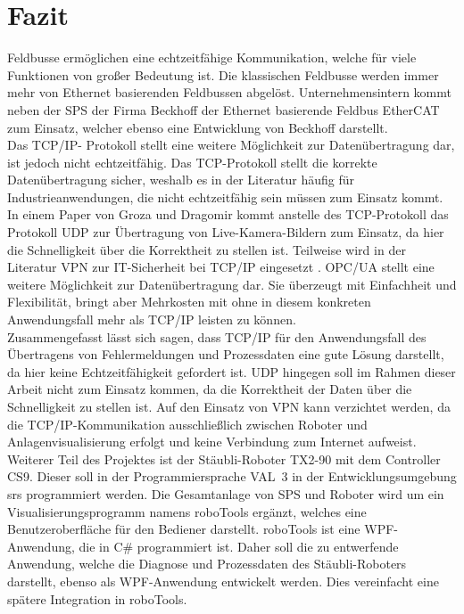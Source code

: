\documentclass[ a4paper,
                oneside,
                toc=bibliography,
                toc=listof
                ]{scrbook}
\begin{document}
   	
   	\section{Fazit}
   	Feldbusse ermöglichen eine echtzeitfähige Kommunikation, welche für viele Funktionen von großer Bedeutung ist. Die klassischen Feldbusse werden immer mehr von Ethernet basierenden Feldbussen abgelöst. Unternehmensintern kommt neben der SPS der Firma Beckhoff der Ethernet basierende Feldbus EtherCAT zum Einsatz, welcher ebenso eine Entwicklung von Beckhoff darstellt.\\
   	Das TCP/IP- Protokoll stellt eine weitere Möglichkeit zur Datenübertragung dar, ist jedoch nicht echtzeitfähig. Das TCP-Protokoll stellt die korrekte Datenübertragung sicher, weshalb es in der Literatur häufig für Industrieanwendungen, die nicht echtzeitfähig sein müssen zum Einsatz kommt.
   	In einem Paper von Groza und Dragomir \cite{groza2008using} kommt anstelle des TCP-Protokoll das Protokoll UDP zur Übertragung von Live-Kamera-Bildern zum Einsatz, da hier die Schnelligkeit über die Korrektheit zu stellen ist. Teilweise wird in der Literatur VPN zur IT-Sicherheit bei TCP/IP eingesetzt \cite{groza2008using}. OPC/UA stellt eine weitere Möglichkeit zur Datenübertragung dar. Sie überzeugt mit Einfachheit und Flexibilität, bringt aber Mehrkosten mit ohne in diesem konkreten Anwendungsfall mehr als TCP/IP leisten zu können.\\ Zusammengefasst lässt sich sagen, dass TCP/IP für den Anwendungsfall des Übertragens von Fehlermeldungen und Prozessdaten eine gute Lösung darstellt, da hier keine Echtzeitfähigkeit gefordert ist. UDP hingegen soll im Rahmen dieser Arbeit nicht zum Einsatz kommen, da die Korrektheit der Daten über die Schnelligkeit zu stellen ist. Auf den Einsatz von VPN kann verzichtet werden, da die TCP/IP-Kommunikation ausschließlich zwischen Roboter und Anlagenvisualisierung erfolgt und keine Verbindung zum Internet aufweist.\\
   	Weiterer Teil des Projektes ist der Stäubli-Roboter TX2-90 mit dem Controller CS9. Dieser soll in der Programmiersprache VAL~3 in der Entwicklungsumgebung \acl{srs} programmiert werden. Die Gesamtanlage von SPS und Roboter wird um ein Visualisierungsprogramm namens roboTools ergänzt, welches eine Benutzeroberfläche für den Bediener darstellt. roboTools ist eine WPF-Anwendung, die in C\# programmiert ist. Daher soll die zu entwerfende Anwendung, welche die Diagnose und Prozessdaten des Stäubli-Roboters darstellt, ebenso als WPF-Anwendung entwickelt werden. Dies vereinfacht eine spätere Integration in roboTools.
   	
\end{document}
